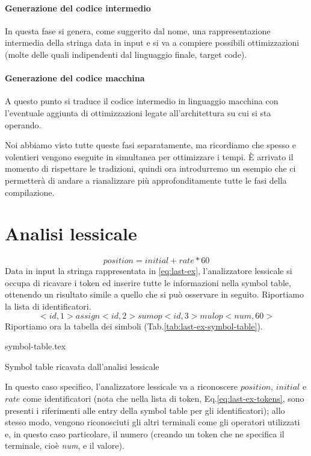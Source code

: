 \documentclass[class=book, crop=false, oneside, 12pt]{standalone}
\begin{document}
\paragraph{Generazione del codice intermedio} In questa fase si genera, come suggerito dal nome, una rappresentazione intermedia della stringa data in input e si va a compiere possibili ottimizzazioni (molte delle quali indipendenti dal linguaggio finale, target code).

\paragraph{Generazione del codice macchina}	A questo punto si traduce il codice intermedio in linguaggio macchina con l'eventuale aggiunta di ottimizzazioni legate all'architettura su cui si sta operando.
    
Noi abbiamo visto tutte queste fasi separatamente, ma ricordiamo che spesso e volentieri vengono eseguite in simultanea per ottimizzare i tempi.
È arrivato il momento di rispettare le tradizioni, quindi ora introdurremo un esempio che ci permetterà di andare a rianalizzare più approfonditamente tutte le fasi della compilazione.
\section{Analisi lessicale}
\begin{equation}
    \label{eq:last-ex}
    position = initial + rate * 60
\end{equation}
Data in input la stringa rappresentata in \ref{eq:last-ex}, l'analizzatore lessicale si occupa di ricavare i token ed inserire tutte le informazioni nella symbol table, ottenendo un risultato simile a quello che si può osservare in seguito.
Riportiamo la lista di identificatori.
\begin{equation}
    \label{eq:last-ex-tokens}
    <id,1> assign <id,2> sumop <id, 3> mulop <num, 60>
\end{equation}
Riportiamo ora la tabella dei simboli (Tab.\ref{tab:last-ex-symbol-table}).
\begin{table}[H]
	\centering
	{symbol-table.tex}
    \caption{Symbol table ricavata dall'analisi lessicale}
    \label{tab:last-ex-symbol-table}
\end{table} 

In questo caso specifico, l'analizzatore lessicale va a riconoscere \(position\), \(initial\) e \(rate\) come identificatori (nota che nella lista di token, Eq.\ref{eq:last-ex-tokens}, sono presenti i riferimenti alle entry della symbol table per gli identificatori); allo stesso modo, vengono riconosciuti gli altri terminali come gli operatori utilizzati e, in questo caso particolare, il numero (creando un token che ne specifica il terminale, cioè \emph{num}, e il valore).
\end{document}
